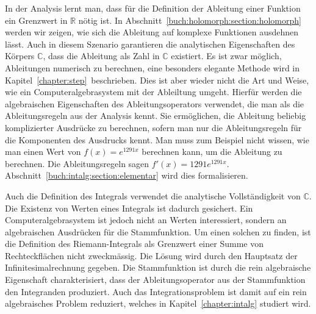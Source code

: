 In der Analysis lernt man, dass für die Definition der Ableitung einer
Funktion ein Grenzwert in $\mathbb{R}$ nötig ist.
In Abschnitt~\ref{buch:holomorph:section:holomorph} werden wir zeigen,
wie sich die Ableitung auf komplexe Funktionen ausdehnen lässt.
Auch in diesem Szenario garantieren die analytischen Eigenschaften des
Körpers $\mathbb{C}$, dass die Ableitung als Zahl in $\mathbb{C}$ existiert.
Es ist zwar möglich, Ableitungen numerisch zu berechnen, eine besonders
elegante Methode wird in Kapitel~\ref{chapter:step} beschrieben.
Dies ist aber wieder nicht die Art und Weise, wie ein Computeralgebrasystem
mit der Ableiltung umgeht.
Hierfür werden die algebraischen Eigenschaften des Ableitungsoperators
verwendet, die man als die Ableitungsregeln aus der Analysis kennt.
Sie ermöglichen, die Ableitung beliebig komplizierter Ausdrücke
zu berechnen, sofern man nur die Ableitungsregeln für die Komponenten
des Ausdrucks kennt.
Man muss zum Beispiel nicht wissen, wie man einen Wert von $f(x)=e^{1291x}$
berechnen kann, um die Ableitung zu berechnen.
Die Ableitungsregeln sagen $f'(x)=1291 e^{1291x}$.
Abschnitt~\ref{buch:intalg:section:elementar} wird dies formalisieren.

Auch die Definition des Integrals verwendet die analytische
Vollständigkeit von $\mathbb{C}$.
Die Existenz von Werten eines Integrals ist dadurch gesichert.
Ein Computeralgebrasystem ist jedoch nicht an Werten interessiert,
sondern an algebraischen Ausdrücken für die Stammfunktion.
Um einen solchen zu finden, ist die Definition des Riemann-Integrals
%
%
als Grenzwert einer Summe von Rechteckflächen nicht zweckmässig.
Die Lösung wird durch den Hauptsatz der Infinitesimalrechnung gegeben.
%
Die Stammfunktion ist durch die rein algebraische Eigenschaft
charakterisiert, dass der Ableitungsoperator aus der Stammfunktion
den Integranden produziert.
Auch das Integrationsproblem ist damit auf ein rein algebraisches
Problem reduziert, welches in Kapitel~\ref{chapter:intalg}
studiert wird.













